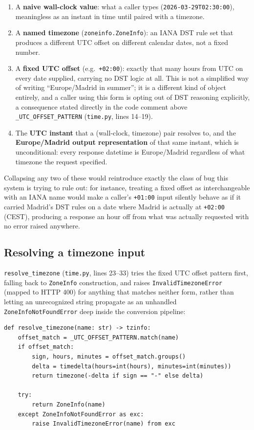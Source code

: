 \documentclass[11pt,a4paper]{article}
\begin{document}
\begin{enumerate}[nosep]
    \item A \textbf{naive wall-clock value}: what a caller types
    (\texttt{2026-03-29T02:30:00}), meaningless as an instant in time until
    paired with a timezone.
    \item A \textbf{named timezone} (\texttt{zoneinfo.ZoneInfo}): an IANA
    DST rule set that produces a different UTC offset on different
    calendar dates, not a fixed number.
    \item A \textbf{fixed UTC offset} (e.g.\ \texttt{+02:00}): exactly that
    many hours from UTC on every date supplied, carrying no DST logic at
    all. This is not a simplified way of writing ``Europe/Madrid in
    summer''; it is a different kind of object entirely, and a caller
    using this form is opting out of DST reasoning explicitly, a
    consequence stated directly in the code comment above
    \texttt{\_UTC\_OFFSET\_PATTERN} (\texttt{time.py}, lines 14--19).
    \item The \textbf{UTC instant} that a (wall-clock, timezone) pair
    resolves to, and the \textbf{Europe/Madrid output representation} of
    that same instant, which is unconditional: every response datetime is
    Europe/Madrid regardless of what timezone the request specified.
\end{enumerate}

Collapsing any two of these would reintroduce exactly the class of bug this
system is trying to rule out: for instance, treating a fixed offset as
interchangeable with an IANA name would make a caller's \texttt{+01:00}
input silently behave as if it carried Madrid's DST rules on a date where
Madrid is actually at \texttt{+02:00} (CEST), producing a response an hour
off from what was actually requested with no error raised anywhere.

\subsection{Resolving a timezone input}

\texttt{resolve\_timezone} (\texttt{time.py}, lines 23--33) tries the fixed
UTC offset pattern first, falling back to \texttt{ZoneInfo} construction,
and raises \texttt{InvalidTimezoneError} (mapped to HTTP 400) for anything
that matches neither form, rather than letting an unrecognized string
propagate as an unhandled \texttt{ZoneInfoNotFoundError} deep inside the
conversion pipeline:

\begin{lstlisting}[caption={Two accepted timezone forms, tried in order. \texttt{backend/app/domain/time.py}, lines 23--33.}]
def resolve_timezone(name: str) -> tzinfo:
    offset_match = _UTC_OFFSET_PATTERN.match(name)
    if offset_match:
        sign, hours, minutes = offset_match.groups()
        delta = timedelta(hours=int(hours), minutes=int(minutes))
        return timezone(-delta if sign == "-" else delta)

    try:
        return ZoneInfo(name)
    except ZoneInfoNotFoundError as exc:
        raise InvalidTimezoneError(name) from exc
\end{lstlisting}
\end{document}
